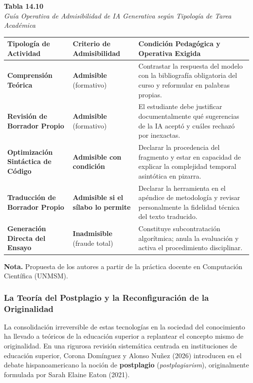\begin{table}[htbp]
\centering
\small
\renewcommand{\arraystretch}{1.25}
\textbf{Tabla 14.10}\\[0.15cm]
\textit{Guía Operativa de Admisibilidad de IA Generativa según Tipología de Tarea Académica}\\[0.25cm]
\begin{tabularx}{\textwidth}{p{3.5cm}p{3.2cm}X}
\toprule
\textbf{Tipología de Actividad} & \textbf{Criterio de Admisibilidad} & \textbf{Condición Pedagógica y Operativa Exigida} \\
\midrule
\textbf{Comprensión Teórica} & \textbf{Admisible} (formativo) & Contrastar la respuesta del modelo con la bibliografía obligatoria del curso y reformular en palabras propias. \\
\textbf{Revisión de Borrador Propio} & \textbf{Admisible} (formativo) & El estudiante debe justificar documentalmente qué sugerencias de la IA aceptó y cuáles rechazó por inexactas. \\
\textbf{Optimización Sintáctica de Código} & \textbf{Admisible con condición} & Declarar la procedencia del fragmento y estar en capacidad de explicar la complejidad temporal asintótica en pizarra. \\
\textbf{Traducción de Borrador Propio} & \textbf{Admisible si el sílabo lo permite} & Declarar la herramienta en el apéndice de metodología y revisar personalmente la fidelidad técnica del texto traducido. \\
\textbf{Generación Directa del Ensayo} & \textbf{Inadmisible} (fraude total) & Constituye subcontratación algorítmica; anula la evaluación y activa el procedimiento disciplinar. \\
\bottomrule
\end{tabularx}
\vspace{0.15cm}
\raggedright \scriptsize \textbf{Nota.} Propuesta de los autores a partir de la práctica docente en Computación Científica (UNMSM).
\end{table}

\subsubsection{La Teoría del Postplagio y la Reconfiguración de la Originalidad}

La consolidación irreversible de estas tecnologías en la sociedad del conocimiento ha llevado a teóricos de la educación superior a replantear el concepto mismo de originalidad. En una rigurosa revisión sistemática centrada en instituciones de educación superior, Corona Domínguez y Alonso Nuñez (2026) introducen en el debate hispanoamericano la noción de \textbf{postplagio} (\textit{postplagiarism}), originalmente formulada por Sarah Elaine Eaton (2021).

